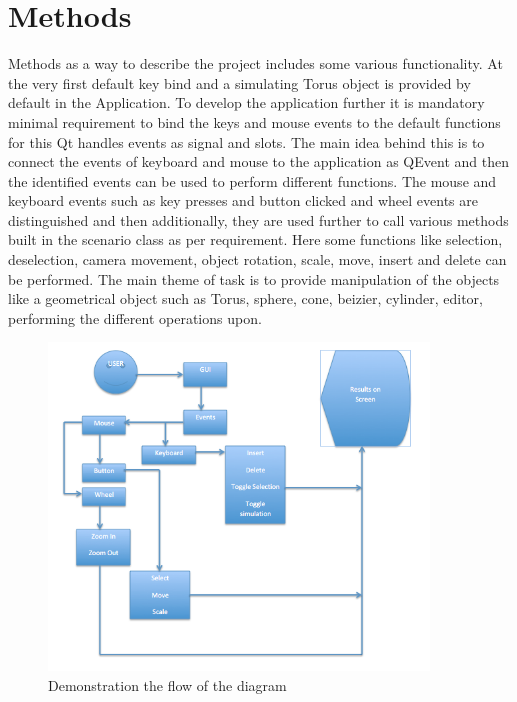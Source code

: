 \documentclass[a4,10pt]{article}
\begin{document}
	  \section{Methods}
	    Methods as a way to describe the project includes some various functionality. At the very first default key bind and a simulating Torus object is provided by default in the Application.
	    To develop the application further it is mandatory minimal requirement to bind the keys and mouse events to the default functions for this Qt handles events as signal and slots. 
	    The main idea behind this is to connect the events of keyboard and mouse to the application as QEvent and then the identified events can be used to perform different functions.
	    The mouse and keyboard events such as key presses and button clicked and wheel events are distinguished and then additionally, they are used further to call various methods built in the scenario class
	    as per requirement. Here some functions like selection, deselection, camera movement, object rotation, scale, move, insert and delete can be performed. The main theme of task is to provide
	    manipulation of the objects like a geometrical object such as Torus, sphere, cone, beizier, cylinder, editor, performing the different operations upon.

\newpage
\begin{figure}[h]
              \centering
              \includegraphics[width=0.9\textwidth]{gfx/flowchart.png}
              \caption{Demonstration the flow of the diagram}
              \label{fig:manipulate}
            \end{figure}
	
\end{document}
